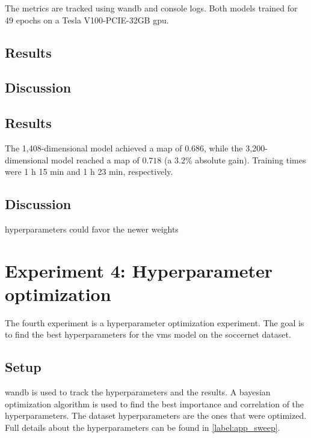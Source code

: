 The metrics are tracked using \acrlong{wandb} and console logs.
Both models trained for 49 epochs on a Tesla V100-PCIE-32GB \acrshort{gpu}.

\subsection{Results}
\label{ssec:ex3_results}

\subsection{Discussion}
\label{ssec:ex3_discussion}


\subsection{Results}
\label{ssec:ex3_results}
The 1,408-dimensional model achieved a  \acrshort{map} of \(0.686\), while the 3,200-dimensional model reached a \acrshort{map} of \(0.718\) (a 3.2\% absolute gain). Training times were 1 h 15 min and 1 h 23 min, respectively.


\subsection{Discussion}
\label{ssec:ex3_discussion}
hyperparameters could favor the newer weights


\section{Experiment 4: Hyperparameter optimization}
\label{sec:experiment4}

The fourth experiment is a hyperparameter optimization experiment.
The goal is to find the best hyperparameters for the \acrshort{vms} model on the soccernet dataset.

\subsection{Setup}
\label{ssec:ex4_setup}

\acrlong{wandb} is used to track the hyperparameters and the results. 
A bayesian optimization algorithm is used to find the best importance and correlation of the hyperparameters.
The dataset hyperparameters are the ones that were optimized. 
Full details about the hyperparameters can be found in \autoref{label:app_sweep}.


